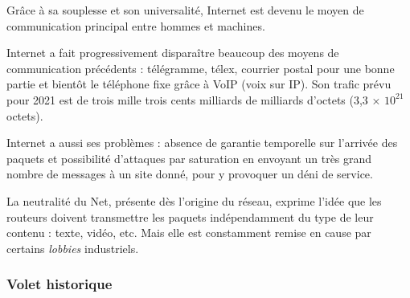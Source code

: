 
\begin{tcolorbox}[title={Introduction}, toprule=0pt, leftrule=0pt, rightrule=0pt, arc=0pt, fonttitle=\scshape\boxtitlefont,
                  colbacktitle=white, coltitle=firstcolor, colframe=firstcolor, colback=firstcolor!10,
                  breakable, enhanced jigsaw]
Grâce à sa souplesse et son universalité, Internet est devenu le moyen de communication principal entre hommes et machines.\end{tcolorbox}

\begin{tcolorbox}[title={Impacts sur les pratiques humaines}, toprule=0pt, leftrule=0pt, rightrule=0pt, arc=0pt,
                  fonttitle=\scshape\boxtitlefont,
                  colbacktitle=white, coltitle=firstcolor, colframe=firstcolor, colback=firstcolor!10,
                  breakable, enhanced jigsaw]
Internet a fait progressivement disparaître beaucoup des moyens de communication précédents : télégramme, télex, courrier postal pour une bonne partie et bientôt le téléphone fixe grâce à VoIP (voix sur IP).
Son trafic prévu pour 2021 est de trois mille trois cents milliards de milliards d’octets (3,3 × $10^{21}$ octets).

Internet a aussi ses problèmes : absence de garantie temporelle sur l’arrivée des paquets et possibilité d’attaques par saturation en envoyant un très grand nombre de messages à un site donné, pour y provoquer un déni de service.

La neutralité du Net, présente dès l’origine du réseau, exprime l’idée que les routeurs doivent transmettre les paquets indépendamment du type de leur contenu : texte, vidéo, etc. Mais elle est constamment remise en cause par certains \textit{lobbies} industriels. 
\end{tcolorbox}

\subsubsection[Volet historique]{Volet historique}
\label{subsub:IX.1.1.2}

